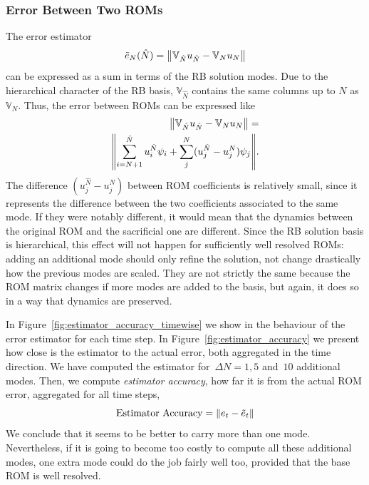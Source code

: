 \documentclass[../../thesis.tex]{subfiles}
\newcommand{\rbV}{\ensuremath{\mathbb{V}}}
\begin{document}
\subsubsection{Error Between Two ROMs}
The error estimator 
\begin{equation}
    \tilde{e}_{N}(\hat{N}) = \norm{\rbV_{\hat{N}} u_{\hat{N}} - \rbV_{N} u_{N}}
\end{equation}
can be expressed as a sum in terms of the RB solution modes.
Due to the hierarchical character of the RB basis, 
$\rbV_{\hat{N}}$ contains the same columns 
up to $N$ as $\rbV_{N}$.
Thus, the error between ROMs can be expressed like
\begin{equation}
    \begin{split}
        \norm{\rbV_{\hat{N}} u_{\hat{N}} - \rbV_{N} u_{N}} 
        = \\ 
        \norm{
        \sum_{i=N+1}^{\hat{N}} u^{\hat{N}}_{i} \psi_{i} 
        + 
        \sum_{j}^{N} (u^{\hat{N}}_{j} - u^{N}_{j}) \psi_j
        }.
    \end{split}
\end{equation}
The difference $(u^{\hat{N}}_{j} - u^{N}_{j})$ between ROM coefficients is relatively small, 
since it represents the difference between the two coefficients associated to the same mode.
If they were notably different, 
it would mean that the dynamics between the original ROM and the sacrificial one are different.
Since the RB solution basis is hierarchical, this effect will not happen for sufficiently well resolved ROMs: 
adding an additional mode should only refine the solution, 
not change drastically how the previous modes are scaled.
They are not strictly the same because the ROM matrix changes if more modes are added to the basis,
but again, it does so in a way that dynamics are preserved.

In Figure~\ref{fig:estimator_accuracy_timewise} we show in the behaviour of the error estimator 
for each time step.
In Figure~\ref{fig:estimator_accuracy} we present how close is the estimator to the actual error,
both aggregated in the time direction.
We have computed the estimator for~\mbox{$\Delta N = 1, 5$} and~$10$ additional modes.
Then, we compute \textit{estimator accuracy}, how far it is from the actual ROM error,
aggregated for all time steps, 
\begin{equation}
    \text{Estimator Accuracy} = \norm{e_t - \tilde{e}_t} 
\end{equation}
We conclude that it seems to be better to carry more than one mode.
Nevertheless, if it is going to become too costly to compute all these additional modes,
one extra mode could do the job fairly well too, provided that the base ROM is well resolved.
\end{document}
